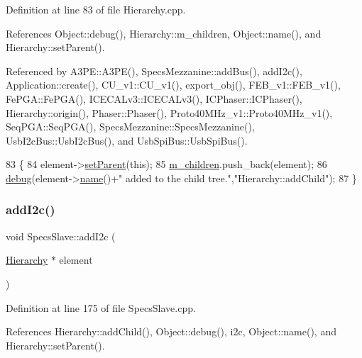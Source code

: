 Definition at line 83 of file Hierarchy.\+cpp.



References Object\+::debug(), Hierarchy\+::m\+\_\+children, Object\+::name(), and Hierarchy\+::set\+Parent().



Referenced by A3\+P\+E\+::\+A3\+P\+E(), Specs\+Mezzanine\+::add\+Bus(), add\+I2c(), Application\+::create(), C\+U\+\_\+v1\+::\+C\+U\+\_\+v1(), export\+\_\+obj(), F\+E\+B\+\_\+v1\+::\+F\+E\+B\+\_\+v1(), Fe\+P\+G\+A\+::\+Fe\+P\+G\+A(), I\+C\+E\+C\+A\+Lv3\+::\+I\+C\+E\+C\+A\+Lv3(), I\+C\+Phaser\+::\+I\+C\+Phaser(), Hierarchy\+::origin(), Phaser\+::\+Phaser(), Proto40\+M\+Hz\+\_\+v1\+::\+Proto40\+M\+Hz\+\_\+v1(), Seq\+P\+G\+A\+::\+Seq\+P\+G\+A(), Specs\+Mezzanine\+::\+Specs\+Mezzanine(), Usb\+I2c\+Bus\+::\+Usb\+I2c\+Bus(), and Usb\+Spi\+Bus\+::\+Usb\+Spi\+Bus().


\begin{DoxyCode}
83                                           \{
84   element->\hyperlink{classHierarchy_a585ad1aeec16077a0e532ab8b4fc557b}{setParent}(\textcolor{keyword}{this});
85   \hyperlink{classHierarchy_a038816763941fd4a930504917f60483b}{m\_children}.push\_back(element);
86   \hyperlink{classObject_aac010553f022165573714b7014a15f0d}{debug}(element->\hyperlink{classObject_a300f4c05dd468c7bb8b3c968868443c1}{name}()+\textcolor{stringliteral}{" added to the child tree."},\textcolor{stringliteral}{"Hierarchy::addChild"});
87 \}
\end{DoxyCode}
\mbox{\label{classSpecsSlave_af462b4d6e716ceb4bd454ad835938737}} 
\subsubsection{\texorpdfstring{add\+I2c()}{addI2c()}}
{\footnotesize\ttfamily void Specs\+Slave\+::add\+I2c (\begin{DoxyParamCaption}\item[{\hyperlink{classHierarchy}{Hierarchy} $\ast$}]{element }\end{DoxyParamCaption})}



Definition at line 175 of file Specs\+Slave.\+cpp.



References Hierarchy\+::add\+Child(), Object\+::debug(), i2c, Object\+::name(), and Hierarchy\+::set\+Parent().



